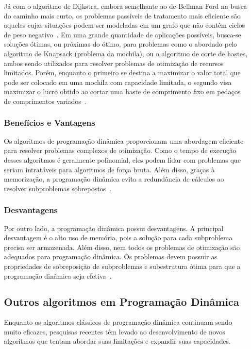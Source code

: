 Já com o algoritmo de Dijkstra, embora semelhante ao de Bellman-Ford na busca do caminho mais curto, os problemas passíveis de tratamento mais eficiente são aqueles cujas situações podem ser modeladas em um grafo que não contêm ciclos de peso negativo~\cite{dijkstra1959note}. Em uma grande quantidade de aplicações possíveis, busca-se soluções ótimas, ou próximas do ótimo, para problemas como o abordado pelo algoritmo de Knapsack (problema da mochila), ou o algoritmo de corte de hastes, ambos sendo utilizados para resolver problemas de otimização de recursos limitados. Porém, enquanto o primeiro se destina a maximizar o valor total que pode ser colocado em uma mochila com capacidade limitada, o segundo visa maximizar o lucro obtido ao cortar uma haste de comprimento fixo em pedaços de comprimentos variados~\cite{cormen2009introduction}.

\subsubsection{Benefícios e Vantagens}

Os algoritmos de programação dinâmica proporcionam uma abordagem eficiente para resolver problemas complexos de otimização. Como o tempo de execução desses algoritmos é geralmente polinomial, eles podem lidar com problemas que seriam intratáveis para algoritmos de força bruta. Além disso, graças à memorização, a programação dinâmica evita a redundância de cálculos ao resolver subproblemas sobrepostos~\cite{bellman1957dynamic}.

\subsubsection{Desvantagens}

Por outro lado, a programação dinâmica possui desvantagens. A principal desvantagem é o alto uso de memória, pois a solução para cada subproblema precisa ser armazenada. Além disso, nem todos os problemas de otimização são adequados para programação dinâmica. Os problemas devem possuir as propriedades de sobreposição de subproblemas e subestrutura ótima para que a programação dinâmica seja efetiva~\cite{cormen2009introduction}.

\subsection{Outros algoritmos em Programação Dinâmica}

Enquanto os algoritmos clássicos de programação dinâmica continuam sendo muito eficazes, pesquisas recentes têm levado ao desenvolvimento de novos algoritmos que tentam abordar suas limitações e expandir suas capacidades. 

